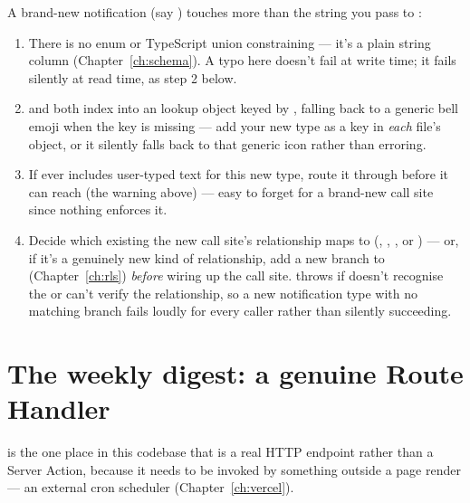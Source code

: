 \begin{olkhowto}
A brand-new notification  (say ) touches more than the string you pass to :
\begin{enumerate}
  \item There is no enum or TypeScript union constraining  — it's a plain string column (Chapter~\ref{ch:schema}). A typo here doesn't fail at write time; it fails silently at read time, as step 2 below.
  \item {} and  both index into an  lookup object keyed by , falling back to a generic bell emoji when the key is missing — add your new type as a key in \emph{each} file's  object, or it silently falls back to that generic icon rather than erroring.
  \item If  ever includes user-typed text for this new type, route it through  before it can reach  (the warning above) — easy to forget for a brand-new call site since nothing enforces it.
  \item Decide which existing  the new call site's relationship maps to (, , , or ) — or, if it's a genuinely new kind of relationship, add a new branch to  (Chapter~\ref{ch:rls}) \emph{before} wiring up the call site.  throws  if  doesn't recognise the  or can't verify the relationship, so a new notification type with no matching branch fails loudly for every caller rather than silently succeeding.
\end{enumerate}
\end{olkhowto}

\section{The weekly digest: a genuine Route Handler}

 is the one place in this codebase that is a real HTTP endpoint rather than a Server Action, because it needs to be invoked by something outside a page render — an external cron scheduler (Chapter~\ref{ch:vercel}).

